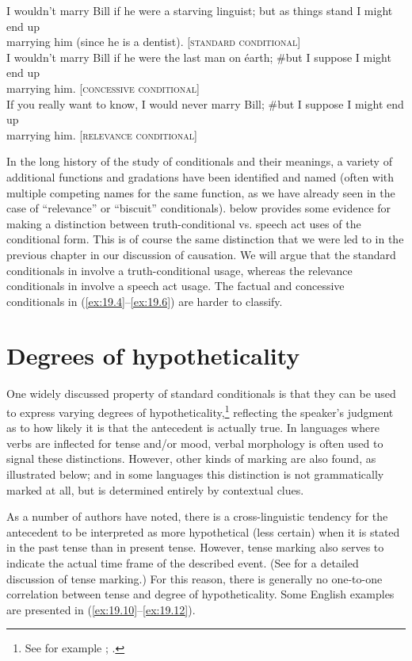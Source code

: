\ea \label{ex:19.9}
\ea  I wouldn’t marry Bill if he were a starving linguist; but as things stand I might end up\\
  marrying him (since he is a dentist).  [\textsc{standard} \textsc{conditional}]\\
\ex I wouldn’t marry Bill if he were the last man on éarth; \#but I suppose I might end up\\
  marrying him.  [\textsc{concessive conditional}]\\
\ex If you really want to know, I would never marry Bill; \#but I suppose I might end up\\
  marrying him.  [\textsc{relevance} \textsc{conditional}]
                       \z
\z


In the long history of the study of conditionals and their meanings, a variety of additional functions and gradations have been identified and named (often with multiple competing names for the same function, as we have already seen in the case of “relevance” or “biscuit” conditionals).  below provides some evidence for making a distinction between truth-conditional vs. speech act uses of the conditional form. This is of course the same distinction that we were led to in the previous chapter in our discussion of causation. We will argue that the standard conditionals in  involve a truth-conditional usage, whereas the relevance conditionals in  involve a speech act usage. The factual and concessive conditionals in (\ref{ex:19.4}--\ref{ex:19.6}) are harder to classify.


\section{Degrees of hypotheticality}\label{sec:19.3}

One widely discussed property of standard conditionals is that they can be used to express varying degrees of hypotheticality,\footnote{See for example \citet{Comrie1986}; \citet{ThompsonEtAl2007}.} reflecting the speaker’s judgment as to how likely it is that the antecedent is actually true. In languages where verbs are inflected for tense and/or mood, verbal morphology is often used to signal these distinctions. However, other kinds of marking are also found, as illustrated below; and in some languages this distinction is not grammatically marked at all, but is determined entirely by contextual clues.



As a number of authors have noted, there is a cross-linguistic tendency for the antecedent to be interpreted as more hypothetical (less certain) when it is stated in the past tense than in present tense. However, tense marking also serves to indicate the actual time frame of the described event. (See  for a detailed discussion of tense marking.) For this reason, there is generally no one-to-one correlation between tense and degree of hypotheticality. Some English examples are presented in (\ref{ex:19.10}--\ref{ex:19.12}).


